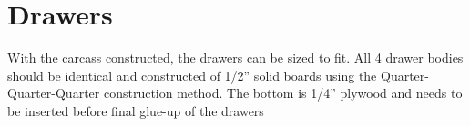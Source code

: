 \section{Drawers}
With the carcass constructed, the drawers can be sized to fit. All 4 drawer bodies should be identical and constructed of 1/2'' solid boards using the Quarter-Quarter-Quarter construction method. The bottom is 1/4'' plywood and needs to be inserted before final glue-up of the drawers
